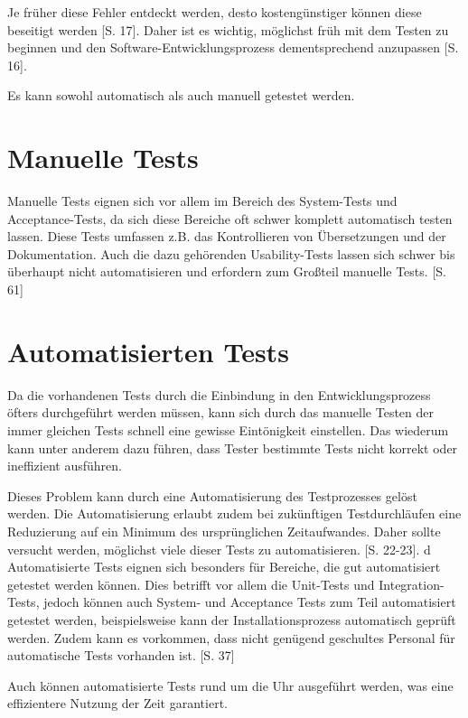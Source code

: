 \documentclass[a4paper,bibtotoc,oneside]{scrbook}
\begin{document}
Je früher diese Fehler entdeckt werden, desto kostengünstiger können diese beseitigt werden \cite{betrieb}[S. 17]. Daher ist es wichtig, möglichst früh mit dem Testen zu beginnen und den Software-Entwicklungsprozess dementsprechend anzupassen \cite{betrieb}[S. 16]. 

Es kann sowohl automatisch als auch manuell getestet werden.

\section{Manuelle Tests}
Manuelle Tests eignen sich vor allem im Bereich des System-Tests und Acceptance-Tests, da sich diese Bereiche oft schwer komplett automatisch testen lassen. Diese Tests umfassen z.B. das Kontrollieren von Übersetzungen und der Dokumentation. Auch die dazu gehörenden Usability-Tests lassen sich schwer bis überhaupt nicht automatisieren und erfordern zum Großteil manuelle Tests. \cite{test_large_systems}[S. 61]


\section{Automatisierten Tests}
Da die vorhandenen Tests durch die Einbindung in den Entwicklungsprozess öfters durchgeführt werden müssen, kann sich durch das manuelle Testen der immer gleichen Tests schnell eine gewisse Eintönigkeit einstellen. Das wiederum kann unter anderem dazu führen, dass Tester bestimmte Tests nicht korrekt oder ineffizient ausführen. 

Dieses Problem kann durch eine Automatisierung des Testprozesses gelöst werden. Die Automatisierung erlaubt zudem bei zukünftigen Testdurchläufen eine Reduzierung auf ein Minimum des ursprünglichen Zeitaufwandes. Daher sollte versucht werden, möglichst viele dieser Tests zu automatisieren. \cite{test_auto}[S. 22-23]. 
d
Automatisierte Tests eignen sich besonders für Bereiche, die gut automatisiert getestet werden können. Dies betrifft vor allem die Unit-Tests und Integration-Tests, jedoch können auch System- und Acceptance Tests zum Teil automatisiert getestet werden, beispielsweise kann der Installationsprozess automatisch geprüft werden. Zudem kann es vorkommen, dass nicht genügend geschultes Personal für automatische Tests vorhanden ist. \cite{eval_automat_webapp_test}[S. 37]

Auch können automatisierte Tests rund um die Uhr ausgeführt werden, was eine effizientere Nutzung der Zeit garantiert.
\end{document}
